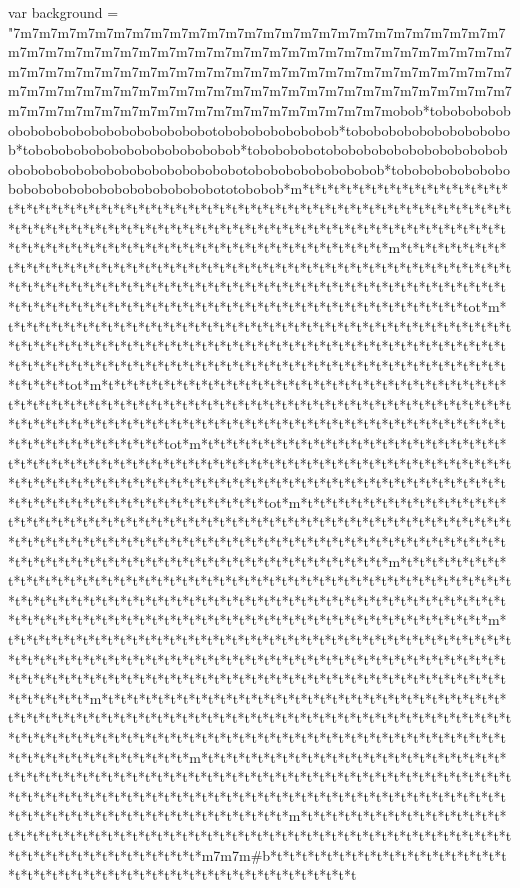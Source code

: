 var background = "7m7m7m7m7m7m7m7m7m7m7m7m7m7m7m7m7m7m7m7m7m7m7m7m7m7m7m7m7m7m7m7m7m7m7m7m7m7m7m7m7m7m7m7m7m7m7m7m7m7m7m7m7m7m7m7m7m7m7m7m7m7m7m7m7m7m7m7m7m7m7m7m7m7m7m7m7m7m7m7m7m7m7m7m7m7m7m7m7m7m7m7m7m7m7m7m7m7m7m7m7m7m7m7m7m7m7m7m7m7m7m7m7m7m7m7m7m7m7m7m7m7m7m7m7m7m7m7mobob*tobobobobobobobobobobobobobobobobobobotobobobobobobobob*tobobobobobobobobobobob*tobobobobobobobobobobobobobob*tobobobobotobobobobobobobobobobobobobobobobobobobobobobobobobobobotobobobobobobobobob*tobobobobobobobobobobobobobobobobobobobobobototobobob*m*t*t*t*t*t*t*t*t*t*t*t*t*t*t*t*t*t*t*t*t*t*t*t*t*t*t*t*t*t*t*t*t*t*t*t*t*t*t*t*t*t*t*t*t*t*t*t*t*t*t*t*t*t*t*t*t*t*t*t*t*t*t*t*t*t*t*t*t*t*t*t*t*t*t*t*t*t*t*t*t*t*t*t*t*t*t*t*t*t*t*t*t*t*t*t*t*t*t*t*t*t*t*t*t*t*t*t*t*t*t*t*t*t*t*t*t*t*t*t*t*t*t*t*t*t*t*t*m*t*t*t*t*t*t*t*t*t*t*t*t*t*t*t*t*t*t*t*t*t*t*t*t*t*t*t*t*t*t*t*t*t*t*t*t*t*t*t*t*t*t*t*t*t*t*t*t*t*t*t*t*t*t*t*t*t*t*t*t*t*t*t*t*t*t*t*t*t*t*t*t*t*t*t*t*t*t*t*t*t*t*t*t*t*t*t*t*t*t*t*t*t*t*t*t*t*t*t*t*t*t*t*t*t*t*t*t*t*t*t*t*t*t*t*t*t*t*t*t*t*t*t*t*t*tot*m*t*t*t*t*t*t*t*t*t*t*t*t*t*t*t*t*t*t*t*t*t*t*t*t*t*t*t*t*t*t*t*t*t*t*t*t*t*t*t*t*t*t*t*t*t*t*t*t*t*t*t*t*t*t*t*t*t*t*t*t*t*t*t*t*t*t*t*t*t*t*t*t*t*t*t*t*t*t*t*t*t*t*t*t*t*t*t*t*t*t*t*t*t*t*t*t*t*t*t*t*t*t*t*t*t*t*t*t*t*t*t*t*t*t*t*t*t*t*t*t*t*t*t*t*t*tot*m*t*t*t*t*t*t*t*t*t*t*t*t*t*t*t*t*t*t*t*t*t*t*t*t*t*t*t*t*t*t*t*t*t*t*t*t*t*t*t*t*t*t*t*t*t*t*t*t*t*t*t*t*t*t*t*t*t*t*t*t*t*t*t*t*t*t*t*t*t*t*t*t*t*t*t*t*t*t*t*t*t*t*t*t*t*t*t*t*t*t*t*t*t*t*t*t*t*t*t*t*t*t*t*t*t*t*t*t*t*t*t*t*t*t*t*t*t*t*t*t*t*t*t*t*t*tot*m*t*t*t*t*t*t*t*t*t*t*t*t*t*t*t*t*t*t*t*t*t*t*t*t*t*t*t*t*t*t*t*t*t*t*t*t*t*t*t*t*t*t*t*t*t*t*t*t*t*t*t*t*t*t*t*t*t*t*t*t*t*t*t*t*t*t*t*t*t*t*t*t*t*t*t*t*t*t*t*t*t*t*t*t*t*t*t*t*t*t*t*t*t*t*t*t*t*t*t*t*t*t*t*t*t*t*t*t*t*t*t*t*t*t*t*t*t*t*t*t*t*t*t*t*t*tot*m*t*t*t*t*t*t*t*t*t*t*t*t*t*t*t*t*t*t*t*t*t*t*t*t*t*t*t*t*t*t*t*t*t*t*t*t*t*t*t*t*t*t*t*t*t*t*t*t*t*t*t*t*t*t*t*t*t*t*t*t*t*t*t*t*t*t*t*t*t*t*t*t*t*t*t*t*t*t*t*t*t*t*t*t*t*t*t*t*t*t*t*t*t*t*t*t*t*t*t*t*t*t*t*t*t*t*t*t*t*t*t*t*t*t*t*t*t*t*t*t*t*t*t*t*t*t*t*m*t*t*t*t*t*t*t*t*t*t*t*t*t*t*t*t*t*t*t*t*t*t*t*t*t*t*t*t*t*t*t*t*t*t*t*t*t*t*t*t*t*t*t*t*t*t*t*t*t*t*t*t*t*t*t*t*t*t*t*t*t*t*t*t*t*t*t*t*t*t*t*t*t*t*t*t*t*t*t*t*t*t*t*t*t*t*t*t*t*t*t*t*t*t*t*t*t*t*t*t*t*t*t*t*t*t*t*t*t*t*t*t*t*t*t*t*t*t*t*t*t*t*t*t*t*t*t*m*t*t*t*t*t*t*t*t*t*t*t*t*t*t*t*t*t*t*t*t*t*t*t*t*t*t*t*t*t*t*t*t*t*t*t*t*t*t*t*t*t*t*t*t*t*t*t*t*t*t*t*t*t*t*t*t*t*t*t*t*t*t*t*t*t*t*t*t*t*t*t*t*t*t*t*t*t*t*t*t*t*t*t*t*t*t*t*t*t*t*t*t*t*t*t*t*t*t*t*t*t*t*t*t*t*t*t*t*t*t*t*t*t*t*t*t*t*t*t*t*t*t*t*t*t*t*t*m*t*t*t*t*t*t*t*t*t*t*t*t*t*t*t*t*t*t*t*t*t*t*t*t*t*t*t*t*t*t*t*t*t*t*t*t*t*t*t*t*t*t*t*t*t*t*t*t*t*t*t*t*t*t*t*t*t*t*t*t*t*t*t*t*t*t*t*t*t*t*t*t*t*t*t*t*t*t*t*t*t*t*t*t*t*t*t*t*t*t*t*t*t*t*t*t*t*t*t*t*t*t*t*t*t*t*t*t*t*t*t*t*t*t*t*t*t*t*t*t*t*t*t*t*t*t*t*m*t*t*t*t*t*t*t*t*t*t*t*t*t*t*t*t*t*t*t*t*t*t*t*t*t*t*t*t*t*t*t*t*t*t*t*t*t*t*t*t*t*t*t*t*t*t*t*t*t*t*t*t*t*t*t*t*t*t*t*t*t*t*t*t*t*t*t*t*t*t*t*t*t*t*t*t*t*t*t*t*t*t*t*t*t*t*t*t*t*t*t*t*t*t*t*t*t*t*t*t*t*t*t*t*t*t*t*t*t*t*t*t*t*t*t*t*t*t*t*t*t*t*t*t*t*t*t*m*t*t*t*t*t*t*t*t*t*t*t*t*t*t*t*t*t*t*t*t*t*t*t*t*t*t*t*t*t*t*t*t*t*t*t*t*t*t*t*t*t*t*t*t*t*t*t*t*t*t*t*t*t*t*t*t*t*t*t*t*t*t*t*t*t*t*t*t*t*t*t*t*m7m7m#b*t*t*t*t*t*t*t*t*t*t*t*t*t*t*t*t*t*t*t*t*t*t*t*t*t*t*t*t*t*t*t*t*t*t*t*t*t*t*t*t*t*t*t*t*t*t*t